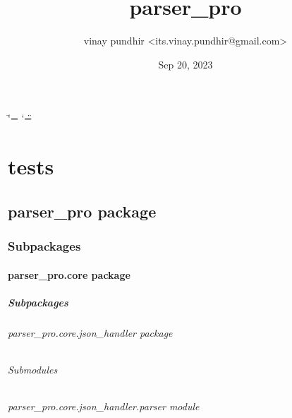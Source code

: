 \documentclass[letterpaper,10pt,english]{sphinxmanual}
\title{parser\_pro}
\date{Sep 20, 2023}
\author{vinay pundhir \textless{}its.vinay.pundhir@gmail.com\textgreater{}}
\begin{document}
\ifdefined\shorthandoff
  \ifnum\catcode`\=\string=\active\shorthandoff{=}\fi
  \ifnum\catcode`\"=\active{}\fi
\fi

\pagestyle{empty}
\sphinxmaketitle
\pagestyle{plain}
\sphinxtableofcontents
\pagestyle{normal}
\label{\detokenize{index::doc}}


\sphinxstepscope


\chapter{tests}
\label{\detokenize{modules:tests}}\label{\detokenize{modules::doc}}
\sphinxstepscope


\section{parser\_pro package}
\label{\detokenize{parser_pro:parser-pro-package}}\label{\detokenize{parser_pro::doc}}

\subsection{Subpackages}
\label{\detokenize{parser_pro:subpackages}}
\sphinxstepscope


\subsubsection{parser\_pro.core package}
\label{\detokenize{parser_pro.core:parser-pro-core-package}}\label{\detokenize{parser_pro.core::doc}}

\paragraph{Subpackages}
\label{\detokenize{parser_pro.core:subpackages}}
\sphinxstepscope


\subparagraph{parser\_pro.core.json\_handler package}
\label{\detokenize{parser_pro.core.json_handler:parser-pro-core-json-handler-package}}\label{\detokenize{parser_pro.core.json_handler::doc}}

\subparagraph{Submodules}
\label{\detokenize{parser_pro.core.json_handler:submodules}}

\subparagraph{parser\_pro.core.json\_handler.parser module}
\label{\detokenize{parser_pro.core.json_handler:module-parser_pro.core.json_handler.parser}}\label{\detokenize{parser_pro.core.json_handler:parser-pro-core-json-handler-parser-module}}
\end{document}

